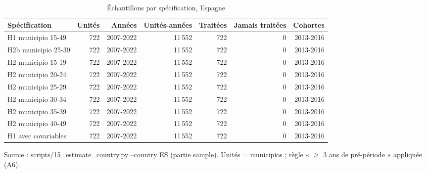 \begin{table}[htbp]\centering
\begin{threeparttable}
\caption{Échantillons par spécification, Espagne}\label{tab:es_sample}
\small
\begin{tabular}{lrrrrrr}
\toprule
Spécification & Unités & Années & Unités-années & Traitées & Jamais traitées & Cohortes \\
\midrule
H1 municipio 15-49 & 722 & 2007-2022 & 11\,552 & 722 & 0 & 2013-2016 \\
H2b municipio 25-39 & 722 & 2007-2022 & 11\,552 & 722 & 0 & 2013-2016 \\
H2 municipio 15-19 & 722 & 2007-2022 & 11\,552 & 722 & 0 & 2013-2016 \\
H2 municipio 20-24 & 722 & 2007-2022 & 11\,552 & 722 & 0 & 2013-2016 \\
H2 municipio 25-29 & 722 & 2007-2022 & 11\,552 & 722 & 0 & 2013-2016 \\
H2 municipio 30-34 & 722 & 2007-2022 & 11\,552 & 722 & 0 & 2013-2016 \\
H2 municipio 35-39 & 722 & 2007-2022 & 11\,552 & 722 & 0 & 2013-2016 \\
H2 municipio 40-49 & 722 & 2007-2022 & 11\,552 & 722 & 0 & 2013-2016 \\
H1 avec covariables & 722 & 2007-2022 & 11\,552 & 722 & 0 & 2013-2016 \\
\bottomrule
\end{tabular}
\begin{tablenotes}\footnotesize
\item Source : scripts/15\_estimate\_country.py --country ES (partie sample). Unités = municipios ; règle « $\geq$ 3 ans de pré-période » appliquée (A6).
\end{tablenotes}
\end{threeparttable}
\end{table}

